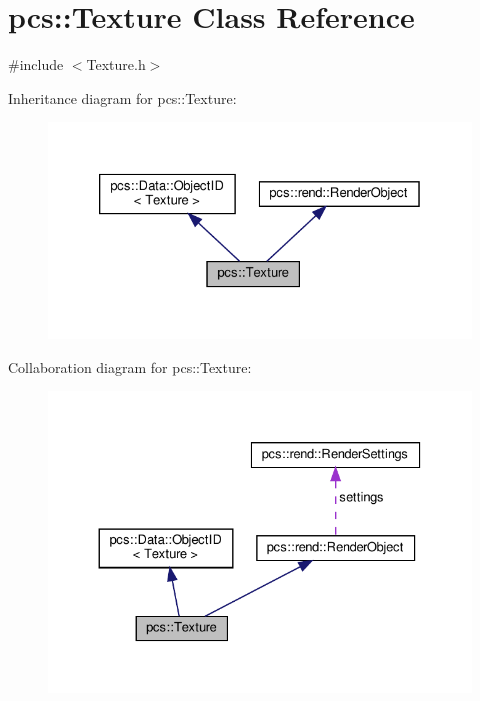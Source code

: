 \hypertarget{classpcs_1_1Texture}{}\section{pcs\+:\+:Texture Class Reference}
\label{classpcs_1_1Texture}


{\ttfamily \#include $<$Texture.\+h$>$}



Inheritance diagram for pcs\+:\+:Texture\+:\nopagebreak
\begin{figure}[H]
\begin{center}
\leavevmode
\includegraphics[width=326pt]{classpcs_1_1Texture__inherit__graph}
\end{center}
\end{figure}


Collaboration diagram for pcs\+:\+:Texture\+:\nopagebreak
\begin{figure}[H]
\begin{center}
\leavevmode
\includegraphics[width=330pt]{classpcs_1_1Texture__coll__graph}
\end{center}
\end{figure}
